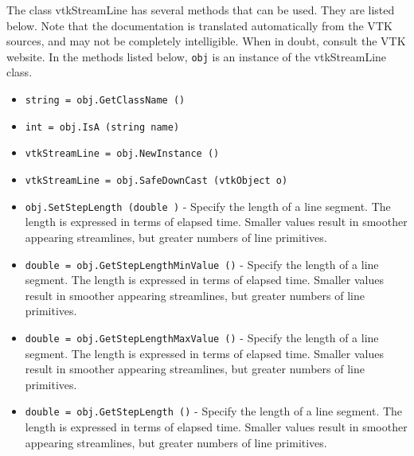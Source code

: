 The class vtkStreamLine has several methods that can be used.
  They are listed below.
Note that the documentation is translated automatically from the VTK sources,
and may not be completely intelligible.  When in doubt, consult the VTK website.
In the methods listed below, \verb|obj| is an instance of the vtkStreamLine class.
\begin{itemize}
\item  \verb|string = obj.GetClassName ()|

\item  \verb|int = obj.IsA (string name)|

\item  \verb|vtkStreamLine = obj.NewInstance ()|

\item  \verb|vtkStreamLine = obj.SafeDownCast (vtkObject o)|

\item  \verb|obj.SetStepLength (double )| -  Specify the length of a line segment. The length is expressed in terms of
 elapsed time. Smaller values result in smoother appearing streamlines, but
 greater numbers of line primitives.

\item  \verb|double = obj.GetStepLengthMinValue ()| -  Specify the length of a line segment. The length is expressed in terms of
 elapsed time. Smaller values result in smoother appearing streamlines, but
 greater numbers of line primitives.

\item  \verb|double = obj.GetStepLengthMaxValue ()| -  Specify the length of a line segment. The length is expressed in terms of
 elapsed time. Smaller values result in smoother appearing streamlines, but
 greater numbers of line primitives.

\item  \verb|double = obj.GetStepLength ()| -  Specify the length of a line segment. The length is expressed in terms of
 elapsed time. Smaller values result in smoother appearing streamlines, but
 greater numbers of line primitives.

\end{itemize}
